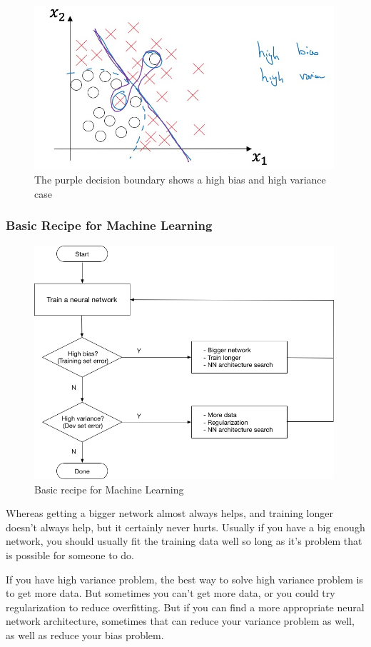 \documentclass[UTF8]{article}
\begin{document}
\begin{figure}[htb]
    \centering
    \includegraphics[width=30em]{figures/bias-and-variance-3}
    \caption{The purple decision boundary shows a high bias and high variance case}
\end{figure}

\subsubsection{Basic Recipe for Machine Learning}
\begin{figure}[htb]
    \centering
    \includegraphics[width=30em]{figures/machine-learning-recipe}
    \caption{Basic recipe for Machine Learning}
    \label{fig:machine-learning-recipe}
\end{figure}

Whereas getting a bigger network almost always helps, and training longer doesn't always help, but
it certainly never hurts. Usually if you have a big enough network, you should usually fit the
training data well so long as it's problem that is possible for someone to do.

If you have high variance problem, the best way to solve high variance problem is to get more data.
But sometimes you can't get more data, or you could try regularization to reduce overfitting. But
if you can find a more appropriate neural network architecture, sometimes that can reduce your
variance problem as well, as well as reduce your bias problem.
\end{document}
